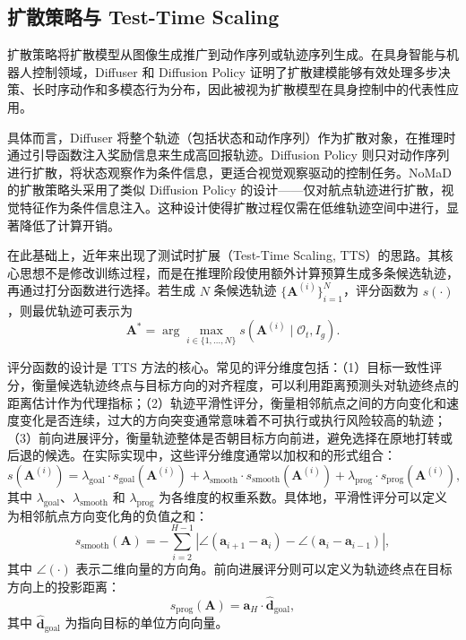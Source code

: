 \subsection{扩散策略与 Test-Time Scaling}

扩散策略将扩散模型从图像生成推广到动作序列或轨迹序列生成\cite{diffuser2022,chi2025diffusion}。在具身智能与机器人控制领域，Diffuser 和 Diffusion Policy 证明了扩散建模能够有效处理多步决策、长时序动作和多模态行为分布，因此被视为扩散模型在具身控制中的代表性应用。

具体而言，Diffuser\cite{diffuser2022} 将整个轨迹（包括状态和动作序列）作为扩散对象，在推理时通过引导函数注入奖励信息来生成高回报轨迹。Diffusion Policy\cite{chi2025diffusion} 则只对动作序列进行扩散，将状态观察作为条件信息，更适合视觉观察驱动的控制任务。NoMaD 的扩散策略头采用了类似 Diffusion Policy 的设计——仅对航点轨迹进行扩散，视觉特征作为条件信息注入。这种设计使得扩散过程仅需在低维轨迹空间中进行，显著降低了计算开销。

在此基础上，近年来出现了测试时扩展（Test-Time Scaling, TTS）的思路\cite{ttsdiffusion2025,ttssearch2025}。其核心思想不是修改训练过程，而是在推理阶段使用额外计算预算生成多条候选轨迹，再通过打分函数进行选择。若生成 $N$ 条候选轨迹 $\{\mathbf{A}^{(i)}\}_{i=1}^N$，评分函数为 $s(\cdot)$，则最优轨迹可表示为
\begin{equation}
\mathbf{A}^{\ast} = \arg\max_{i\in\{1,\ldots,N\}} s\!\left(\mathbf{A}^{(i)} \mid \mathcal{O}_t, I_g\right).
\end{equation}

评分函数的设计是 TTS 方法的核心。常见的评分维度包括：（1）目标一致性评分，衡量候选轨迹终点与目标方向的对齐程度，可以利用距离预测头对轨迹终点的距离估计作为代理指标；（2）轨迹平滑性评分，衡量相邻航点之间的方向变化和速度变化是否连续，过大的方向突变通常意味着不可执行或执行风险较高的轨迹；（3）前向进展评分，衡量轨迹整体是否朝目标方向前进，避免选择在原地打转或后退的候选。在实际实现中，这些评分维度通常以加权和的形式组合：
\begin{equation}
s(\mathbf{A}^{(i)}) = \lambda_{\text{goal}} \cdot s_{\text{goal}}(\mathbf{A}^{(i)}) + \lambda_{\text{smooth}} \cdot s_{\text{smooth}}(\mathbf{A}^{(i)}) + \lambda_{\text{prog}} \cdot s_{\text{prog}}(\mathbf{A}^{(i)}),
\end{equation}
其中 $\lambda_{\text{goal}}$、$\lambda_{\text{smooth}}$ 和 $\lambda_{\text{prog}}$ 为各维度的权重系数。具体地，平滑性评分可以定义为相邻航点方向变化角的负值之和：
\begin{equation}
s_{\text{smooth}}(\mathbf{A}) = -\sum_{i=2}^{H-1} \left|\angle(\mathbf{a}_{i+1} - \mathbf{a}_i) - \angle(\mathbf{a}_i - \mathbf{a}_{i-1})\right|,
\end{equation}
其中 $\angle(\cdot)$ 表示二维向量的方向角。前向进展评分则可以定义为轨迹终点在目标方向上的投影距离：
\begin{equation}
s_{\text{prog}}(\mathbf{A}) = \mathbf{a}_H \cdot \hat{\mathbf{d}}_{\text{goal}},
\end{equation}
其中 $\hat{\mathbf{d}}_{\text{goal}}$ 为指向目标的单位方向向量。


